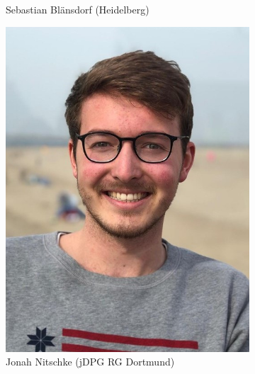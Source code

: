 \documentclass[compress, aspectratio=169]{beamer}
\begin{document}
\begin{frame}
\begin{figure}
\begin{subfigure}[t]{0.24\textwidth}
         \caption*{Sebastian Blänsdorf (Heidelberg)}
     \end{subfigure}
       \begin{subfigure}[t]{0.24\textwidth}
         \includegraphics[height=.5\textheight]{Nitschke.jpeg}
         \caption*{Jonah Nitschke (jDPG RG Dortmund)}
     \end{subfigure}
         \begin{subfigure}[t]{0.24\textwidth}

\end{subfigure}
\end{figure}
\end{frame}
\end{document}
